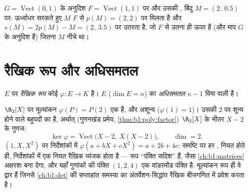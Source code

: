 \begin{omfigure}

{\small $G = \operatorname{Vect}(0,1)$ के अनुदिश $F =
\operatorname{Vect}(1,1)$ पर  और उसकी , बिंदु $M = (2,\ 0.5)$
पर: ऊर्ध्वाधर सरकते हुए $M$ $F$ से $p(M) = (2,2)$ पर मिलता है और $s(M) =
2p(M) - M = (2,\ 3.5)$ पर उतरता है, जो $F$ से उतना ही ऊपर है (और माप $G$ के
अनुदिश है) जितना $M$ नीचे था।}
\end{omfigure}

\section{रैखिक रूप और अधिसमतल}

\begin{definition}\label{def:b1:linmaps:forms}
$E$ पर \emph{रैखिक रूप} कोई  $\varphi
\colon E \to K$ है। $E$ ($\dim E = n$) का \emph{अधिसमतल} $n -
1$ विमा वाली  है।
\end{definition}

\begin{example}
\label{ex:b1:linmaps:evaluationform}
$\R_2[X]$ पर मूल्यांकन $\varphi(P) = P(2)$ एक  है, और अशून्य
($\varphi(1) = 1$)। उसकी  $2$ पर शून्य होने वाले बहुपदों का  है,
अर्थात् (गुणनखंड प्रमेय, \cref{thm:b1:poly:factor}) $\R_2[X]$ के भीतर $X -
2$ के गुणज:
\[
\ker\varphi = \operatorname{Vect}\bigl(X - 2,\ X(X - 2)\bigr),
\qquad \dim = 2 .
\]
$(1, X, X^2)$ पर निर्देशांकों में $\varphi(a + bX + cX^2) = a + 2b + 4c$:
 समष्टि पर हर ,  नियत होते ही, निर्देशांकों में एक
नियत रैखिक व्यंजक होता है --- रूप ``पंक्ति सदिश'' हैं, जैसा
\cref{ch:b1:matrices} अक्षरशः बना देगा, और यहाँ गुणांकों की पंक्ति $(1, 2,
4)$ एक वांडरमोंड पंक्ति है: मूल्यांकन रूप ही वे द्वार हैं जिनसे
\cref{ch:b1:det} की सप्ताहांत समस्या का अंतर्वेशन-सिद्धांत रैखिक बीजगणित में
प्रवेश करता है।
\end{example}

